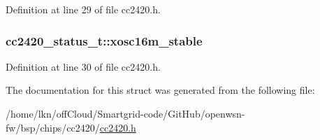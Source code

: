 Definition at line 29 of file cc2420.\+h.

\subsubsection[{\texorpdfstring{xosc16m\+\_\+stable}{xosc16m_stable}}]{ cc2420\+\_\+status\+\_\+t\+::xosc16m\+\_\+stable}\hypertarget{structcc2420__status__t_acbd70cdcf05944ea2b21b11b235d5d7a}{}\label{structcc2420__status__t_acbd70cdcf05944ea2b21b11b235d5d7a}


Definition at line 30 of file cc2420.\+h.



The documentation for this struct was generated from the following file\+:\begin{DoxyCompactItemize}
\item 
/home/lkn/off\+Cloud/\+Smartgrid-\/code/\+Git\+Hub/openwsn-\/fw/bsp/chips/cc2420/\hyperlink{cc2420_8h}{cc2420.\+h}\end{DoxyCompactItemize}
